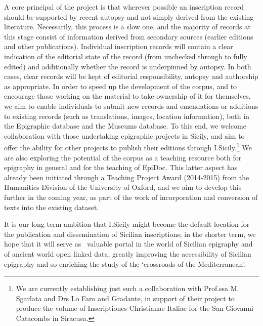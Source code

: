 \documentclass[amsthm,ebook]{saparticle}
\begin{document}
A core principal of the project is that wherever possible an inscription record should be supported by recent autopsy
and not simply derived from the existing literature. Necessarily, this process is a slow one, and the majority of
records at this stage consist of information derived from secondary sources (earlier editions and other publications).
Individual inscription records will contain a clear indication of the editorial state of the record (from unchecked
through to fully edited) and additionally whether the record is underpinned by autopsy. In both cases, clear records
will be kept of editorial responsibility, autopsy and authorship as appropriate. In order to speed up the development
of the corpus, and to encourage those working on the material to take ownership of it for themselves, we aim to enable
individuals to submit new records and emendations or additions to existing records (such as translations, images,
location information), both in the Epigraphic database and the Museums database. To this end, we welcome collaboration
with those undertaking epigraphic projects in Sicily, and aim to offer the ability for other projects to publish their
editions through I.Sicily.\footnote{ We are currently establishing just such a collaboration with Prof.ssa M. Sgarlata
and Drs Lo Faro and Gradante, in support of their project to produce the volume of Inscriptiones Christianae Italiae
for the San Giovanni Catacombs in Siracusa.} We are also exploring the potential of the corpus as a teaching resource
both for epigraphy in general and for the teaching of EpiDoc. This latter aspect has already been initiated through a
Teaching Project Award (2014-2015) from the Humanities Division of the University of Oxford, and we aim to develop this
further in the coming year, as part of the work of incorporation and conversion of texts into the existing dataset.

It is our long-term ambition that I.Sicily might become the default location for the publication and dissemination of
Sicilian inscriptions; in the shorter term, we hope that it will serve as \ valuable portal in the world of Sicilian
epigraphy and of ancient world open linked data, greatly improving the accessibility of Sicilian epigraphy and so
enriching the study of the ‘crossroads of the Mediterranean’.


\bigskip


\bigskip
\end{document}
